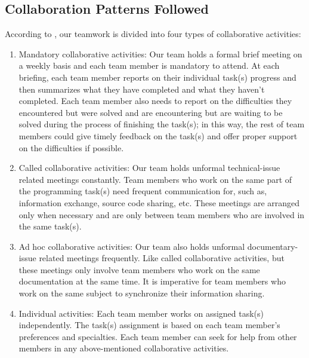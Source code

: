\documentclass[12pt]{article}
\begin{document}
\subsection{Collaboration Patterns Followed}
According to \cite{robillard2000types}, our teamwork is divided into four types of collaborative activities:\newline
\begin{enumerate}
    \item Mandatory collaborative activities: \newline
    Our team holds a formal brief meeting on a weekly basis and each team member is mandatory to attend. At each briefing, each team member reports on their individual task(s) progress and then summarizes what they have completed and what they haven’t completed. \newline
    Each team member also needs to report on the difficulties they encountered but were solved and are encountering but are waiting to be solved during the process of finishing the task(s); in this way, the rest of team members could give timely feedback on the task(s) and offer proper support on the difficulties if possible.
    \item Called collaborative activities: \newline
    Our team holds unformal technical-issue related meetings constantly. Team members who work on the same part of the programming task(s) need frequent communication for, such as, information exchange, source code sharing, etc. These meetings are arranged only when necessary and are only between team members who are involved in the same task(s).
    \item Ad hoc collaborative activities: \newline
    Our team also holds unformal documentary-issue related meetings frequently. Like called collaborative activities, but these meetings only involve team members who work on the same documentation at the same time. It is imperative for team members who work on the same subject to synchronize their information sharing.
    \item Individual activities: \newline
    Each team member works on assigned task(s) independently. The task(s) assignment is based on each team member’s preferences and specialties. Each team member can seek for help from other members in any above-mentioned collaborative activities.

\end{enumerate}
\end{document}
